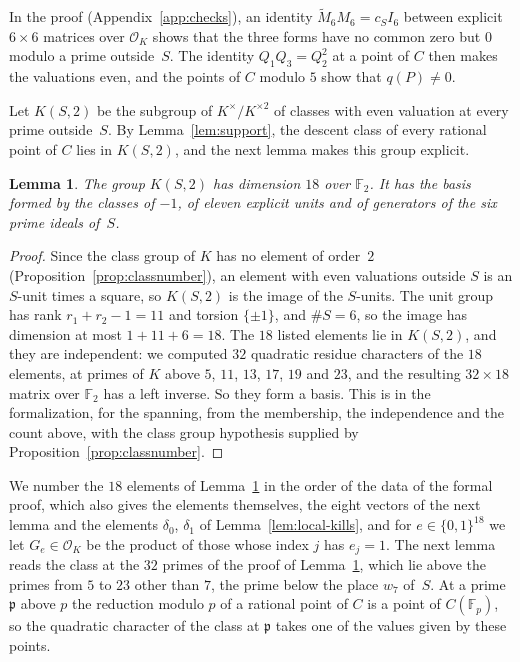 \documentclass[11pt]{amsart}
\newtheorem{lemma}[theorem]{Lemma}
\theoremstyle{definition}
\numberwithin{equation}{section}
\newcommand{\F}{\mathbb{F}}
\newcommand{\OK}{\mathcal{O}_K}
\newcommand{\sq}[1]{#1^{\times}/#1^{\times 2}}
\newcommand{\lean}[1]{\ignorespaces}
\begin{document}
In the proof (Appendix~\ref{app:checks}), an identity $\tilde M_6M_6=c_S I_6$ between explicit $6\times6$ matrices over $\OK$ shows that the three forms have no common zero but $0$ modulo a prime outside~$S$. The identity $Q_1Q_3=Q_2^2$ at a point of $C$ then makes the valuations even, and the points of $C$ modulo $5$ show that $q(P)\neq0$.

Let $K(S,2)$ be the subgroup of $\sq{K}$ of classes with even valuation at every prime outside~$S$. By Lemma~\ref{lem:support}, the descent class of every rational point of $C$ lies in $K(S,2)$, and the next lemma makes this group explicit.

\begin{lemma}\label{lem:sunits-K}\lean{FurioLombardo.M1.exists_isSquare_mul_prod, FurioLombardo.M1.gProd_eq_sq, FurioLombardo.M1.selmer_int, FurioLombardo.M2.Proved.clK21TwoTorsionTrivial, FurioLombardo.M1.gU_mem, FurioLombardo.M1.rank_le, FurioLombardo.M1.S_finite, FurioLombardo.M1.S_ncard}
The group $K(S,2)$ has dimension $18$ over $\F_2$. It has the basis formed by the classes of $-1$, of eleven explicit units and of generators of the six prime ideals of~$S$.
\end{lemma}

\begin{proof}
Since the class group of $K$ has no element of order~$2$ (Proposition~\ref{prop:classnumber}), an element with even valuations outside $S$ is an $S$-unit times a square, so $K(S,2)$ is the image of the $S$-units. The unit group has rank $r_1+r_2-1=11$ and torsion $\{\pm1\}$, and $\#S=6$, so the image has dimension at most $1+11+6=18$. The $18$ listed elements lie in $K(S,2)$, and they are independent: we computed $32$ quadratic residue characters of the $18$ elements, at primes of $K$ above $5$, $11$, $13$, $17$, $19$ and $23$, and the resulting $32\times18$ matrix over $\F_2$ has a left inverse. So they form a basis. This is  in the formalization, for the spanning, from the membership, the independence and the count above, with the class group hypothesis supplied by Proposition~\ref{prop:classnumber}.
\end{proof}

We number the $18$ elements of Lemma~\ref{lem:sunits-K} in the order of the data of the formal proof, which also gives the elements themselves, the eight vectors of the next lemma and the elements $\delta_0$, $\delta_1$ of Lemma~\ref{lem:local-kills}, and for $e\in\{0,1\}^{18}$ we let $G_e\in\OK$ be the product of those whose index $j$ has $e_j=1$. The next lemma reads the class at the $32$ primes of the proof of Lemma~\ref{lem:sunits-K}, which lie above the primes from $5$ to $23$ other than $7$, the prime below the place $w_7$ of~$S$. At a prime $\mathfrak p$ above $p$ the reduction modulo $p$ of a rational point of $C$ is a point of $C(\F_p)$, so the quadratic character of the class at $\mathfrak p$ takes one of the values given by these points.
\end{document}
